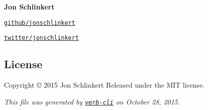 {\bfseries Jon Schlinkert}


\begin{DoxyItemize}
\item \href{https://github.com/jonschlinkert}{\tt github/jonschlinkert}
\item \href{http://twitter.com/jonschlinkert}{\tt twitter/jonschlinkert}
\end{DoxyItemize}

\subsection*{License}

Copyright © 2015 Jon Schlinkert Released under the M\+IT license.





{\itshape This file was generated by \href{https://github.com/assemble/verb-cli}{\tt verb-\/cli} on October 28, 2015.} 